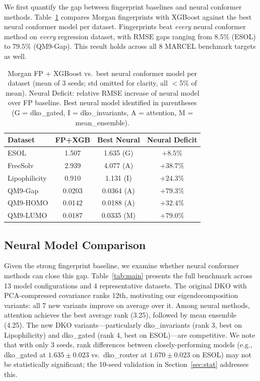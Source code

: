 \documentclass[sigconf]{acmart}
\begin{document}
We first quantify the gap between fingerprint baselines and neural conformer methods. Table~\ref{tab:fp} compares Morgan fingerprints with XGBoost against the best neural conformer model per dataset. Fingerprints beat \emph{every} neural conformer method on \emph{every} regression dataset, with RMSE gaps ranging from $8.5\%$ (ESOL) to $79.5\%$ (QM9-Gap). This result holds across all 8 MARCEL benchmark targets as well.

\begin{table}[t]
\caption{Morgan FP + XGBoost vs.\ best neural conformer model per dataset (mean of 3 seeds; std omitted for clarity, all $<$5\% of mean). Neural Deficit: relative RMSE increase of neural model over FP baseline. Best neural model identified in parentheses (G = dko\_gated, I = dko\_invariants, A = attention, M = mean\_ensemble).}
\label{tab:fp}
\centering
\small
\begin{tabular}{@{}lccc@{}}
\toprule
Dataset & FP+XGB & Best Neural & Neural Deficit \\
\midrule
ESOL         & 1.507 & 1.635 (G) & $+8.5\%$ \\
FreeSolv     & 2.939 & 4.077 (A) & $+38.7\%$ \\
Lipophilicity & 0.910 & 1.131 (I) & $+24.3\%$ \\
QM9-Gap      & 0.0203 & 0.0364 (A) & $+79.3\%$ \\
QM9-HOMO     & 0.0142 & 0.0188 (A) & $+32.4\%$ \\
QM9-LUMO     & 0.0187 & 0.0335 (M) & $+79.0\%$ \\
\bottomrule
\end{tabular}
\end{table}

\subsection{Neural Model Comparison}

Given the strong fingerprint baseline, we examine whether neural conformer methods can close this gap. Table~\ref{tab:main} presents the full benchmark across 13 model configurations and 4 representative datasets. The original DKO with PCA-compressed covariance ranks 12th, motivating our eigendecomposition variants: all 7 new variants improve on average over it. Among neural methods, attention achieves the best average rank (3.25), followed by mean ensemble (4.25). The new DKO variants---particularly dko\_invariants (rank 3, best on Lipophilicity) and dko\_gated (rank 4, best on ESOL)---are competitive. We note that with only 3 seeds, rank differences between closely-performing models (e.g., dko\_gated at $1.635{\pm}0.023$ vs.\ dko\_router at $1.670{\pm}0.023$ on ESOL) may not be statistically significant; the 10-seed validation in Section~\ref{sec:stat} addresses this.
\end{document}
